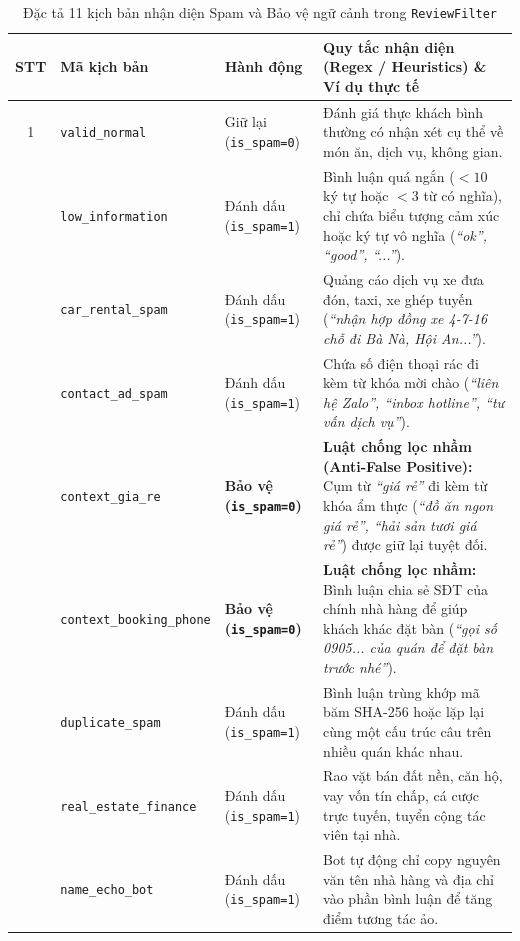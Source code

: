 \documentclass[12pt, a4paper]{article}
\begin{document}
\begin{table}[H]
\centering
\caption{Đặc tả 11 kịch bản nhận diện Spam và Bảo vệ ngữ cảnh trong \texttt{ReviewFilter}}
\label{tab:spam_cases}
\vspace{0.15cm}
\scriptsize
\begin{tabularx}{\textwidth}{c l l X}
\toprule
\rowcolor{blue!8}
\textbf{STT} & \textbf{Mã kịch bản} & \textbf{Hành động} & \textbf{Quy tắc nhận diện (Regex / Heuristics) \& Ví dụ thực tế} \\
\midrule
1 & \texttt{valid\_normal} & Giữ lại (\texttt{is\_spam=0}) & Đánh giá thực khách bình thường có nhận xét cụ thể về món ăn, dịch vụ, không gian. \\
\addlinespace
2 & \texttt{low\_information} & Đánh dấu (\texttt{is\_spam=1}) & Bình luận quá ngắn ($< 10$ ký tự hoặc $< 3$ từ có nghĩa), chỉ chứa biểu tượng cảm xúc hoặc ký tự vô nghĩa (\textit{``ok'', ``good'', ``...''}). \\
\addlinespace
3 & \texttt{car\_rental\_spam} & Đánh dấu (\texttt{is\_spam=1}) & Quảng cáo dịch vụ xe đưa đón, taxi, xe ghép tuyến (\textit{``nhận hợp đồng xe 4-7-16 chỗ đi Bà Nà, Hội An...''}). \\
\addlinespace
4 & \texttt{contact\_ad\_spam} & Đánh dấu (\texttt{is\_spam=1}) & Chứa số điện thoại rác đi kèm từ khóa mời chào (\textit{``liên hệ Zalo'', ``inbox hotline'', ``tư vấn dịch vụ''}). \\
\addlinespace
5 & \texttt{context\_gia\_re} & \textbf{Bảo vệ (\texttt{is\_spam=0})} & \textbf{Luật chống lọc nhầm (Anti-False Positive):} Cụm từ \textit{``giá rẻ''} đi kèm từ khóa ẩm thực (\textit{``đồ ăn ngon giá rẻ'', ``hải sản tươi giá rẻ''}) được giữ lại tuyệt đối. \\
\addlinespace
6 & \texttt{context\_booking\_phone} & \textbf{Bảo vệ (\texttt{is\_spam=0})} & \textbf{Luật chống lọc nhầm:} Bình luận chia sẻ SĐT của chính nhà hàng để giúp khách khác đặt bàn (\textit{``gọi số 0905... của quán để đặt bàn trước nhé''}). \\
\addlinespace
7 & \texttt{duplicate\_spam} & Đánh dấu (\texttt{is\_spam=1}) & Bình luận trùng khớp mã băm SHA-256 hoặc lặp lại cùng một cấu trúc câu trên nhiều quán khác nhau. \\
\addlinespace
8 & \texttt{real\_estate\_finance} & Đánh dấu (\texttt{is\_spam=1}) & Rao vặt bán đất nền, căn hộ, vay vốn tín chấp, cá cược trực tuyến, tuyển cộng tác viên tại nhà. \\
\addlinespace
9 & \texttt{name\_echo\_bot} & Đánh dấu (\texttt{is\_spam=1}) & Bot tự động chỉ copy nguyên văn tên nhà hàng và địa chỉ vào phần bình luận để tăng điểm tương tác ảo. \\

\end{tabularx}
\end{table}
\end{document}
